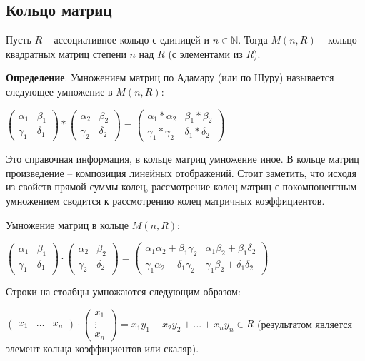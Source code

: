 \documentclass[a4paper]{book}
\begin{document}
\subsection{Кольцо матриц}

Пусть $R$ -- ассоциативное кольцо с единицей и $n\in \mathbb{N}$. Тогда $M(n,R)$ -- кольцо квадратных матриц степени $n$ над $R$ (с элементами из $R$). 

\textbf{Определение}. Умножением матриц по Адамару (или по Шуру) называется следующее умножение в $M(n,R)$:

$\begin{pmatrix}
	\alpha_1 & \beta_1\\
	\gamma_1 & \delta_1
\end{pmatrix}
\ast
\begin{pmatrix}
\alpha_2 & \beta_2\\
\gamma_2 & \delta_2
\end{pmatrix}
=
\begin{pmatrix}
	\alpha_1\ast\alpha_2 & \beta_1\ast\beta_2\\
	\gamma_1\ast\gamma_2 & \delta_1\ast\delta_2
\end{pmatrix}$

Это справочная информация, в кольце матриц умножение иное. В кольце матриц произведение -- композиция линейных отображений. Стоит заметить, что исходя из свойств прямой суммы колец, рассмотрение колец матриц с покомпонентным умножением сводится к рассмотрению колец матричных коэффициентов. 

Умножение матриц в кольце  $M(n,R)$:

$\begin{pmatrix}
\alpha_1 & \beta_1\\
\gamma_1 & \delta_1
\end{pmatrix}
\cdot
\begin{pmatrix}
\alpha_2 & \beta_2\\
\gamma_2 & \delta_2
\end{pmatrix}
=
\begin{pmatrix}
\alpha_1\alpha_2 + \beta_1\gamma_2 & \alpha_1\beta_2 + \beta_1\delta_2\\
\gamma_1\alpha_2 + \delta_1\gamma_2 & \gamma_1\beta_2 + \delta_1\delta_2
\end{pmatrix}$

Строки на столбцы умножаются следующим образом: 

$\begin{pmatrix}
x_{1} & \dots & x_{n}
\end{pmatrix}
\cdot
\begin{pmatrix}
x_1\\
\vdots\\
x_n
\end{pmatrix}
=
x_1y_1+x_2y_2+...+x_ny_n \in R$ (результатом является элемент кольца коэффициентов или скаляр). 
\end{document}
